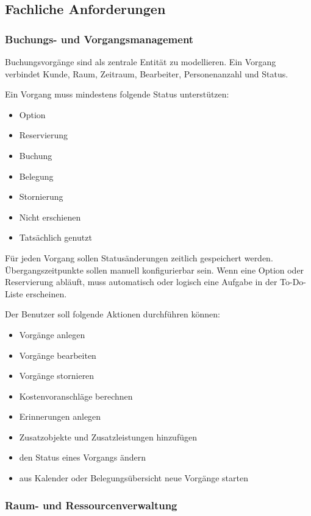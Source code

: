 \subsection{Fachliche Anforderungen}

\subsubsection{Buchungs- und Vorgangsmanagement}

Buchungsvorgänge sind als zentrale Entität zu modellieren. Ein Vorgang verbindet Kunde, Raum, Zeitraum, Bearbeiter, Personenanzahl und Status.

Ein Vorgang muss mindestens folgende Status unterstützen:

\begin{itemize}
\item Option
\item Reservierung
\item Buchung
\item Belegung
\item Stornierung
\item Nicht erschienen
\item Tatsächlich genutzt
\end{itemize}

Für jeden Vorgang sollen Statusänderungen zeitlich gespeichert werden. Übergangszeitpunkte sollen manuell konfigurierbar sein. Wenn eine Option oder Reservierung abläuft, muss automatisch oder logisch eine Aufgabe in der To-Do-Liste erscheinen.

Der Benutzer soll folgende Aktionen durchführen können:

\begin{itemize}
\item Vorgänge anlegen
\item Vorgänge bearbeiten
\item Vorgänge stornieren
\item Kostenvoranschläge berechnen
\item Erinnerungen anlegen
\item Zusatzobjekte und Zusatzleistungen hinzufügen
\item den Status eines Vorgangs ändern
\item aus Kalender oder Belegungsübersicht neue Vorgänge starten
\end{itemize}

\subsubsection{Raum- und Ressourcenverwaltung}

